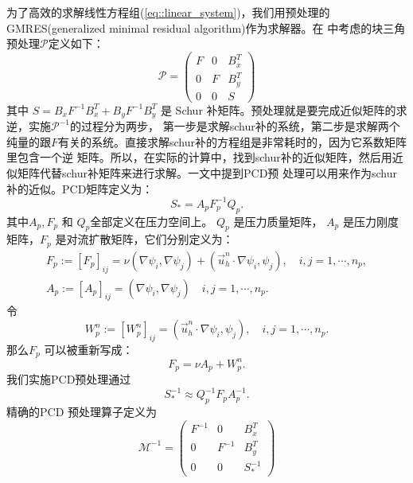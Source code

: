   为了高效的求解线性方程组(\ref{eq::linear_system})，我们用预处理的GMRES(generalized minimal residual algorithm)作为求解器。在\cite{elman2005finite}
  中考虑的块三角预处理$\mathcal{P}$定义如下：
  \begin{equation}
    \mathcal{P} =
    \left(
      \begin{array}{lll}
        F & 0 & B_x^T \\
        0 & F  & B_y^T \\
        0 & 0 & S
      \end{array}
    \right)
  \end{equation}
  其中 $S = B_xF^{-1}B_x^T + B_yF^{-1}B_y^T$ 是 Schur 补矩阵。预处理就是要完成近似矩阵的求逆，实施$\mathcal{P}^{-1}$的过程分为两步，
  第一步是求解schur补的系统，第二步是求解两个纯量的跟$F$有关的系统。直接求解schur补的方程组是非常耗时的，因为它系数矩阵里包含一个逆
  矩阵。所以，在实际的计算中，找到schur补的近似矩阵，然后用近似矩阵代替schur补矩阵来进行求解。\cite{elman2005finite}一文中提到PCD预
  处理可以用来作为schur补的近似。PCD矩阵定义为：
  \begin{equation}
    S_* = A_p F_p^{-1} Q_p.
    \label{eq::PCD}
  \end{equation}
  其中$A_p, F_p$ 和 $Q_p$全部定义在压力空间上。 $Q_p$ 是压力质量矩阵， $A_p$ 是压力刚度矩阵，$F_p$ 是对流扩散矩阵，它们分别定义为：
  \begin{eqnarray}
    F_p := [F_p]_{ij} = \nu (\nabla \psi_i, \nabla \psi_j) +
    (\vec{u}_h^n \cdot \nabla \psi_i, \psi_j), \quad i,j = 1, \cdots, n_p, \\
    A_p := [A_p]_{ij} = (\nabla \psi_i, \nabla \psi_j)\quad i,j = 1, \cdots,
    n_p.
    \label{eq::pcd_mat}
  \end{eqnarray}
  令
  \begin{equation}
    W_p^n := [W_p^n]_{ij} = (\vec{u}_h^n \cdot \nabla \psi_i,
    \psi_j), \quad i,j = 1, \cdots, n_p.
  \end{equation}
  那么$F_p$ 可以被重新写成：
  \begin{equation}
    F_p = \nu A_p + W_p^n.
  \end{equation}
  我们实施PCD预处理通过
  \begin{equation}
    S_*^{-1} \approx Q_p^{-1} F_p A_p^{-1}.
  \end{equation}
  精确的PCD 预处理算子定义为
  \begin{equation}
    \mathcal{M}^{-1} =
    \left(
      \begin{array}{lll}
        F^{-1} & 0 & B_x^T \\
        0 & F^{-1} & B_y^T \\
        0 & 0 &S_*^{-1}
      \end{array}
    \right)
  \end{equation}
